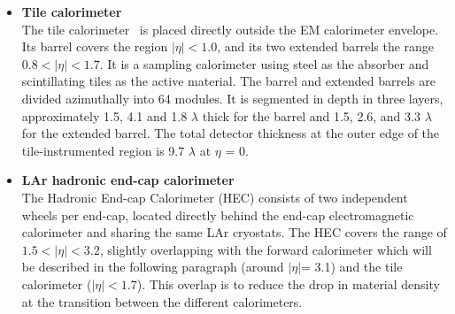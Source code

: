 \begin{itemize}
		\item \textbf{Tile calorimeter} \\
		The tile calorimeter~\cite{ATLAS-TDR-03} is placed directly outside the EM calorimeter envelope. 
		Its	barrel covers the region $|\eta|< 1.0$, and its two extended barrels 
		the range $0.8 < |\eta|< 1.7$. It is a
		sampling calorimeter using steel as the absorber and scintillating tiles 
		as the active material. The	barrel and extended barrels are divided azimuthally 
		into 64 modules. 
		It is segmented in depth in three
		layers, approximately 1.5, 4.1 and 1.8 $\lambda$ 
		thick for the barrel and 1.5, 2.6, and
		3.3 $\lambda$ for the extended barrel. 
		The total detector thickness at the outer edge of the tile-instrumented
		region is 9.7 $\lambda$ at $\eta$ = 0. 
		\item  \textbf{LAr hadronic end-cap calorimeter} \\
		The Hadronic End-cap Calorimeter (HEC) consists of two
		independent wheels per end-cap, located directly behind the end-cap 
		electromagnetic calorimeter and sharing the same LAr cryostats. 
		The HEC covers the range of $1.5< |\eta|< 3.2$, 
		slightly overlapping with the forward calorimeter which 
		will be described in the following paragraph 
		(around $|\eta|$= 3.1) and the tile calorimeter ($|\eta|< 1.7$).
		This overlap is to reduce the drop in material 
		density at the transition between
		the different calorimeters.

\end{itemize}
